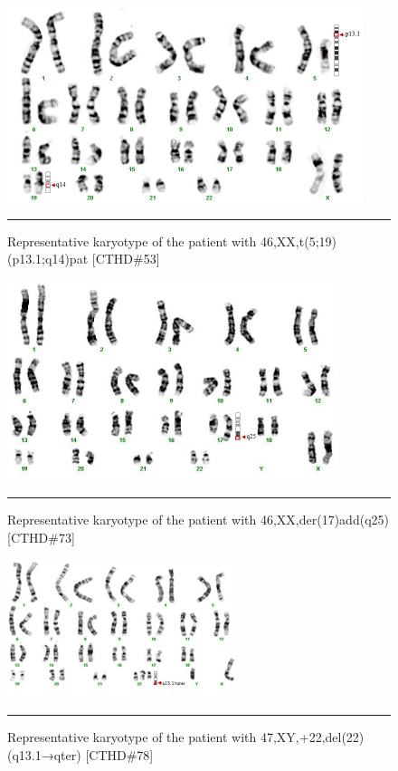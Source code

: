\begin{refsection}
\begin{figure}[!thbp]
\centering
\includegraphics[width=\linewidth]{Figures/Figure3_1.pdf}
\rule{35em}{0.5pt}
\caption{Representative karyotype of the patient with 46,XX,t(5;19)(p13.1;q14)pat [CTHD\#53]}
\label{fig:KT3.1}
\end{figure}

\begin{figure}[!thbp]
\centering
\includegraphics[width=\linewidth]{Figures/Figure3_2.pdf}
\rule{35em}{0.5pt}
\caption{Representative karyotype of the patient with 46,XX,der(17)add(q25) [CTHD\#73]}
\label{fig:KT3.2}
\end{figure}

\begin{figure}[!thbp]
\centering
\includegraphics[width=\linewidth]{Figures/Figure3_3.pdf}
\rule{35em}{0.5pt}
\caption{Representative karyotype of the patient with 47,XY,+22,del(22)(q13.1→qter) [CTHD\#78]}
\label{fig:KT3.3}
\end{figure}


\end{refsection}
